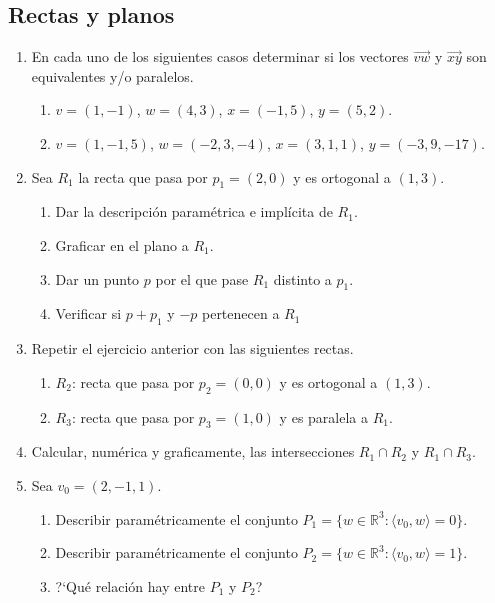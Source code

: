 \subsection*{Rectas y planos}


\begin{enumerate}[resume,topsep=6pt, itemsep=.4cm]

\item En  cada uno de los siguientes casos determinar si los
vectores  $\overrightarrow{vw}$ y $\overrightarrow{xy}$ son
equivalentes y/o paralelos.
\begin{enumerate}
\item   $v=(1,-1)$,  $w=(4,3)$, $x=(-1,5)$, $y=(5,2)$.
\item   $v=(1,-1,5)$,  $w=(-2,3,-4)$,  $x=(3,1,1)$,  $y=(-3,9,-17)$.
\end{enumerate}


\item Sea $R_1$ la recta que pasa por $p_1=(2,0)$ y es ortogonal a $(1,3)$.
\begin{enumerate}
 \item Dar la descripción paramétrica e implícita de $R_1$.
 \item Graficar en el plano a $R_1$.
 \item Dar un punto $p$ por el que pase $R_1$ distinto a $p_1$.
 \item Verificar si $p+p_1$ y $-p$ pertenecen a $R_1$
\end{enumerate}


\item Repetir el ejercicio anterior con las siguientes rectas.
\begin{enumerate}
    \item
    $R_2$: recta que pasa por $p_2=(0,0)$ y es ortogonal a $(1,3)$.
    \item
    $R_3$: recta que pasa por $p_3=(1,0)$ y es paralela a $R_1$.
\end{enumerate}


\item Calcular, numérica y graficamente, las intersecciones $R_1\cap R_2$ y $R_1\cap R_3$.


\item Sea $v_0=(2,-1,1)$.
\begin{enumerate}
    \item Describir paramétricamente el conjunto
    $P_1=\{w\in\mathbb{ R}^3:\langle v_0 , w  \rangle=0\}$.
    \item Describir paramétricamente el conjunto
    $P_2=\{w\in\mathbb{ R}^3:\langle v_0 , w  \rangle=1\}$.
    \item ?`Qué relación hay entre $P_1$ y $P_2$?
\end{enumerate}




\end{enumerate}
